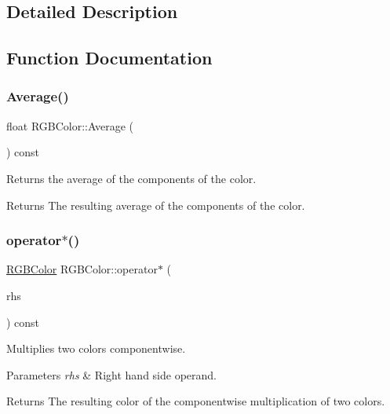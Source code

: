 \subsection{Detailed Description}


\subsection{Function Documentation}
\hypertarget{group___utilities_gaea22cae2344d4a4187b50732820e50c8}{}\label{group___utilities_gaea22cae2344d4a4187b50732820e50c8} 
\subsubsection{\texorpdfstring{Average()}{Average()}}
{\footnotesize\ttfamily float R\+G\+B\+Color\+::\+Average (\begin{DoxyParamCaption}{ }\end{DoxyParamCaption}) const\hspace{0.3cm}{\ttfamily [inline]}}

Returns the average of the components of the color. \begin{DoxyReturn}{Returns}
The resulting average of the components of the color. 
\end{DoxyReturn}
\hypertarget{group___utilities_ga38cb49925dc77a366b56b546b7dd17ae}{}\label{group___utilities_ga38cb49925dc77a366b56b546b7dd17ae} 
\subsubsection{\texorpdfstring{operator$\ast$()}{operator*()}\hspace{0.1cm}{\footnotesize\ttfamily [1/2]}}
{\footnotesize\ttfamily \hyperlink{class_r_g_b_color}{R\+G\+B\+Color} R\+G\+B\+Color\+::operator$\ast$ (\begin{DoxyParamCaption}\item[{const \hyperlink{class_r_g_b_color}{R\+G\+B\+Color} \&}]{rhs }\end{DoxyParamCaption}) const\hspace{0.3cm}{\ttfamily [inline]}}

Multiplies two colors componentwise. 
\begin{DoxyParams}{Parameters}
{\em rhs} & Right hand side operand. \\
\hline
\end{DoxyParams}
\begin{DoxyReturn}{Returns}
The resulting color of the componentwise multiplication of two colors. 
\end{DoxyReturn}
\hypertarget{group___utilities_ga46707b8ca0c4b560914f2aae4ec31eb5}{}\label{group___utilities_ga46707b8ca0c4b560914f2aae4ec31eb5} 
